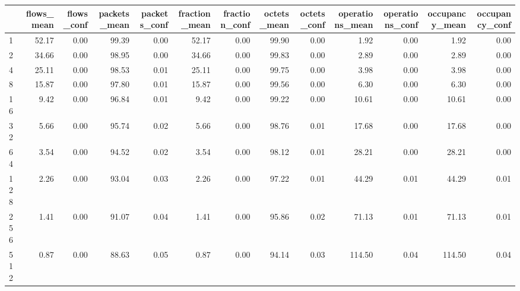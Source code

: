 \begin{tabular}{lrrrrrrrrrrrr}
\toprule
{} &  flows\_mean &  flows\_conf &  packets\_mean &  packets\_conf &  fraction\_mean &  fraction\_conf &  octets\_mean &  octets\_conf &  operations\_mean &  operations\_conf &  occupancy\_mean &  occupancy\_conf \\
\midrule
1        &       52.17 &        0.00 &         99.39 &          0.00 &          52.17 &           0.00 &        99.90 &         0.00 &             1.92 &             0.00 &            1.92 &            0.00 \\
2        &       34.66 &        0.00 &         98.95 &          0.00 &          34.66 &           0.00 &        99.83 &         0.00 &             2.89 &             0.00 &            2.89 &            0.00 \\
4        &       25.11 &        0.00 &         98.53 &          0.01 &          25.11 &           0.00 &        99.75 &         0.00 &             3.98 &             0.00 &            3.98 &            0.00 \\
8        &       15.87 &        0.00 &         97.80 &          0.01 &          15.87 &           0.00 &        99.56 &         0.00 &             6.30 &             0.00 &            6.30 &            0.00 \\
16       &        9.42 &        0.00 &         96.84 &          0.01 &           9.42 &           0.00 &        99.22 &         0.00 &            10.61 &             0.00 &           10.61 &            0.00 \\
32       &        5.66 &        0.00 &         95.74 &          0.02 &           5.66 &           0.00 &        98.76 &         0.01 &            17.68 &             0.00 &           17.68 &            0.00 \\
64       &        3.54 &        0.00 &         94.52 &          0.02 &           3.54 &           0.00 &        98.12 &         0.01 &            28.21 &             0.00 &           28.21 &            0.00 \\
128      &        2.26 &        0.00 &         93.04 &          0.03 &           2.26 &           0.00 &        97.22 &         0.01 &            44.29 &             0.01 &           44.29 &            0.01 \\
256      &        1.41 &        0.00 &         91.07 &          0.04 &           1.41 &           0.00 &        95.86 &         0.02 &            71.13 &             0.01 &           71.13 &            0.01 \\
512      &        0.87 &        0.00 &         88.63 &          0.05 &           0.87 &           0.00 &        94.14 &         0.03 &           114.50 &             0.04 &          114.50 &            0.04 \\

\end{tabular}
